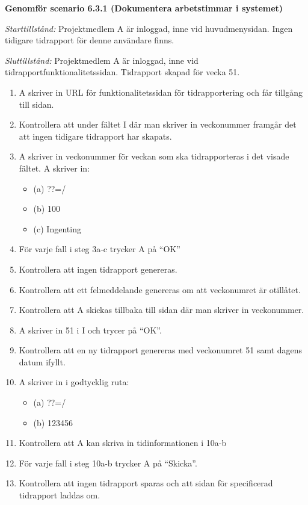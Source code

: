 \documentclass[a4paper]{article}
\begin{document}
\begin{ST}




\item
\textbf{Genomför scenario 6.3.1 (Dokumentera arbetstimmar i systemet)}

\emph{Starttillstånd:} Projektmedlem A är inloggad, inne vid huvudmenysidan. Ingen tidigare tidrapport för denne användare finns.

\emph{Sluttillstånd:} Projektmedlem A är inloggad, inne vid tidrapportfunktionalitetssidan. Tidrapport skapad för vecka 51.

\begin{enumerate}
\item A skriver in URL för funktionalitetssidan för tidrapportering och får tillgång till sidan.
\item Kontrollera att under fältet I där man skriver in veckonummer framgår det att ingen tidigare tidrapport har skapats.
\item A skriver in veckonummer för veckan som ska tidrapporteras i det visade fältet. A skriver in:
\begin{itemize}
\item[] (a) ??=/
\item[] (b) 100
\item[] (c) Ingenting
\end{itemize}
\item För varje fall i steg 3a-c trycker A på ``OK''
\item Kontrollera att ingen tidrapport genereras.
\item Kontrollera att ett felmeddelande genereras om att veckonumret är otillåtet.
\item Kontrollera att A skickas tillbaka till sidan där man skriver in veckonummer.
\item A skriver in 51 i I och trycer på ``OK''.
\item Kontrollera att en ny tidrapport genereras med veckonumret 51 samt dagens datum ifyllt.
\item A skriver in i godtycklig ruta:
\begin{itemize}
\item[] (a) ??=/
\item[] (b) 123456
\end{itemize}
\item Kontrollera att A kan skriva in tidinformationen i 10a-b
\item För varje fall i steg 10a-b trycker A på ``Skicka''. 
\item Kontrollera att ingen tidrapport sparas och att sidan för specificerad tidrapport laddas om.

\end{enumerate}
\end{ST}
\end{document}
